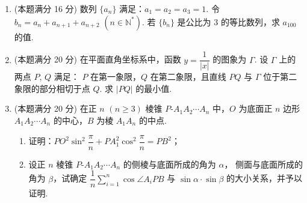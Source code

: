 \documentclass{chsmc}
\begin{document}
\begin{enumerate}[resume]
  \item (本题满分 16 分) 数列 $\{a_n\}$ 满足：$a_1 = a_2 = a_3 = 1$.
    令 $b_n = a_n + a_{n+1} + a_{n+2}$ $(n \in \mathbb{N}^*)$.
    若 $\{b_n\}$ 是公比为 $3$ 的等比数列，求 $a_{100}$ 的值.
  \item (本题满分 20 分) 在平面直角坐标系中，函数
    $y = \dfrac{1}{|x|}$ 的图象为 $\Gamma$. 设 $\Gamma$ 上的两点 $P$, $Q$ 满足：
    $P$ 在第一象限，$Q$ 在第二象限，且直线 $PQ$ 与 $\Gamma$ 位于第二象限的部分相切于点 $Q$.
    求 $|PQ|$ 的最小值.
  \item (本题满分 20 分) 在正 $n$ $(n \geqslant 3)$ 棱锥
    $P\text{-}A_1 A_2 \cdots A_n$ 中，$O$ 为底面正 $n$ 边形
    $A_1 A_2 \cdots A_n$ 的中心，$B$ 为棱 $A_1 A_n$ 的中点.
    \begin{enumerate}[(1)]
      \item 证明：$PO^2\sin^2\dfrac{\pi}{n} + PA_1^2\cos^2\dfrac{\pi}{n} = PB^2$；
      \item 设正 $n$ 棱锥 $P\text{-}A_1 A_2 \cdots A_n$ 的侧棱与底面所成的角为 $\alpha$，
        侧面与底面所成的角为 $\beta$，试确定
        $\dfrac{1}{n}\displaystyle\sum_{i=1}^{n}\cos\angle A_i PB$
        与 $\sin\alpha\cdot\sin\beta$ 的大小关系，并予以证明.
    \end{enumerate}
\end{enumerate}
\end{document}
